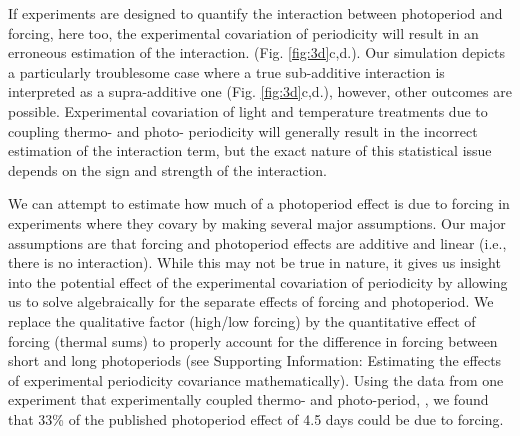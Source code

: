 \documentclass[11pt]{article}
\begin{document}
If experiments are designed to quantify the interaction between photoperiod and forcing, here too, the experimental covariation of periodicity will result in an erroneous estimation of the interaction. (Fig. \ref{fig:3d}c,d.). Our simulation depicts a particularly troublesome case where a true sub-additive interaction is interpreted as a supra-additive one (Fig. \ref{fig:3d}c,d.), however, other outcomes are possible. Experimental covariation of light and temperature treatments due to coupling thermo- and photo- periodicity will generally result in the incorrect estimation of the interaction term, but the exact nature of this statistical issue depends on the sign and strength of the interaction.
%

We can attempt to estimate how much of a photoperiod effect is due to forcing in experiments where they covary by making several major assumptions. Our major assumptions are that forcing and photoperiod effects are additive and linear (i.e., there is no interaction). While this may not be true in nature, it gives us insight into the potential effect of the experimental covariation of periodicity by allowing us to solve algebraically for the separate effects of forcing and photoperiod. We replace the qualitative factor (high/low forcing) by the quantitative effect of forcing (thermal sums) to properly account for the difference in forcing between short and long photoperiods (see Supporting Information: Estimating the effects of experimental periodicity covariance mathematically). Using the data from one experiment that experimentally coupled thermo- and photo-period, \citet{Flynn2018}, we found that 33\% of the published photoperiod effect of 4.5 days could be due to forcing. 
\end{document}
